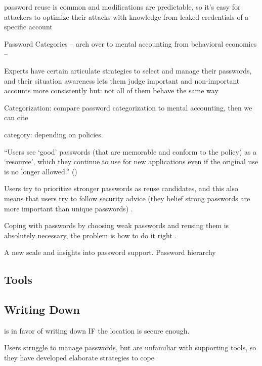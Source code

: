 	password reuse is common and modifications are predictable, so it's easy for attackers to optimize their attacks with knowledge from leaked credentials of a specific account \cite{Das2014TangledWeb}

	Password Categories -- arch over to mental accounting from behavioral economics -- \cite{Thaler2004}
	
	Experts have certain articulate strategies to select and manage their passwords, and their situation awareness lets them judge important and non-important accounts more consistently  	\cite{Stobert2015ExpertPassword} 
	but: not all of them behave the same way \cite{Loutfi2015PasswordsOtherSideOfTheFence}

	Categorization: 
	compare password categorization to mental accounting, then we can cite \cite{Stockinger2015TowardsBE}
	
	category: depending on policies. \cite{Stobert2014PasswordLifeCycle}
	
	
	``Users see `good' passwords (that are memorable and conform to the policy) as a `resource', which they continue to use for new applications even if the original use is no longer allowed.'' (\cite{Inglesant2010TrueCostOfUnusablePolicies})
	
	Users try to prioritize stronger passwords as reuse candidates, and this also means that users try to follow security advice (they belief strong passwords are more important than unique passwords) \cite{Wash2016UnderstandingPasswordChoices}.
	
	Coping with passwords by choosing weak passwords and reusing them is absolutely necessary, the problem is how to do it right \cite{Florencio2014PasswordPortfoliosFiniteUser}.
	
	A new scale and insights into password support. Password hierarchy \cite{Haque2015PhdProposal}
	
	\subsection{Tools}
	
	\subsection{Writing Down}
	\cite{Herley2012PersistenceOfPasswords} is in favor of writing down IF the location is secure enough.
	
	Users struggle to manage passwords, but are unfamiliar with supporting tools, so they have developed elaborate strategies to cope \cite{Stobert2014Agony}
	
